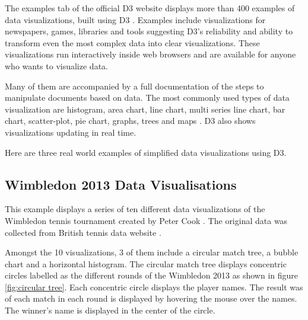\documentclass[9pt,twocolumn,twoside]{styles/osajnl}
\begin{document}
The examples tab of the official D3 website displays more than 400 examples of data visualizations, built using D3 \cite{www-gallery}. Examples include visualizations for newspapers, games, libraries and tools suggesting D3's reliability and ability to transform even the most complex data into clear visualizations. These visualizations run interactively inside web browsers and are available for anyone who wants to visualize data. 

Many of them are accompanied by a full documentation of the steps to manipulate documents based on data. The most commonly used types of data visualization are histogram, area chart, line chart, multi series line chart, bar chart, scatter-plot, pie chart, graphs, trees and maps \cite{www-gallery}. D3 also shows visualizations updating in real time.

Here are three real world examples of simplified data visualizations using D3.

\subsection{Wimbledon 2013 Data Visualisations}
This example displays a series of ten different
data visualizations of the Wimbledon tennis tournament created by Peter Cook \cite{www-cook}. The original data was collected from British tennis data
website \cite{www-tennis}.

Amongst the 10 visualizations, 3 of them include a circular match tree, a bubble chart and a horizontal histogram. The circular match tree displays concentric circles labelled as the different rounds of the Wimbledon 2013 as shown in figure \ref{fig:circular tree}. Each concentric circle displays the player names. The result was of each match in each round is displayed by hovering the mouse over the names. The winner's name is displayed in the center of the circle.
\end{document}
